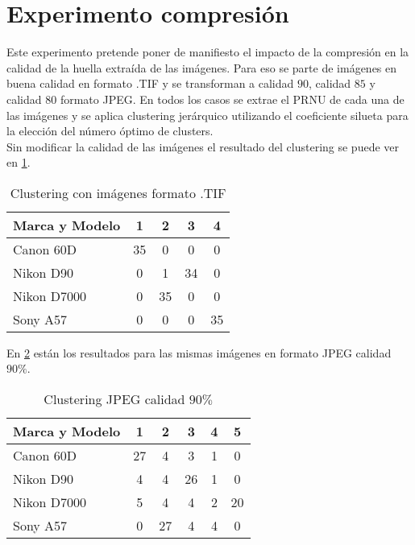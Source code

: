 \section{Experimento compresión}
Este experimento pretende poner de manifiesto el impacto de la compresión en la calidad de la huella extraída de las imágenes. Para eso se parte de imágenes en buena calidad en formato .TIF y se transforman a calidad $90$, calidad $85$ y calidad $80$ formato JPEG. En todos los casos se extrae el PRNU de cada una de las imágenes y se aplica clustering jerárquico utilizando el coeficiente silueta para la elección del número óptimo de clusters. \\

Sin modificar la calidad de las imágenes el resultado del clustering se puede ver en \ref{tabla:compresion100}.

\begin{table}[!htb]
    \centering
        \begin{tabular}{|l|c|c|c|c|}
        \hline
        \rowcolor[gray]{0.9}
        \textbf{Marca y Modelo} & 1 & 2 & 3 & 4 \\ \hline
        Canon 60D & 35 & 0 & 0 & 0 \\ \hline
        Nikon D90 & 0 & 1 & 34 & 0 \\ \hline
        Nikon D7000 & 0 & 35 & 0 & 0 \\ \hline
        Sony A57 & 0 & 0 & 0 & 35 \\ \hline
        \end{tabular}
    \caption{Clustering con imágenes formato .TIF}
    \label{tabla:compresion100}
\end{table}

En \ref{tabla:compresion90} están los resultados para las mismas imágenes en formato JPEG calidad $90\%$.

\begin{table}[!htb]
    \centering
        \begin{tabular}{|l|c|c|c|c|c|}
        \hline
        \rowcolor[gray]{0.9}
        \textbf{Marca y Modelo} & 1 & 2 & 3 & 4 & 5\\ \hline
        Canon 60D & 27 & 4 & 3 & 1 & 0 \\ \hline
        Nikon D90 & 4 & 4 & 26 & 1 & 0 \\ \hline
        Nikon D7000 & 5 & 4 & 4 & 2 & 20 \\ \hline
        Sony A57 & 0 & 27 & 4 & 4 & 0 \\ \hline
        \end{tabular}
    \caption{Clustering JPEG calidad $90\%$}
    \label{tabla:compresion90}
\end{table}

